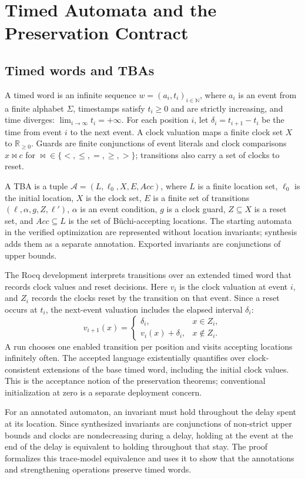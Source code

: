 \documentclass{ieeeaccess}
\providecommand{\Nat}{\mathbb{N}}
\providecommand{\Real}{\mathbb{R}}
\begin{document}
\section{Timed Automata and the Preservation Contract}
\label{sec:model}
\subsection{Timed words and TBAs}
A timed word is an infinite sequence $w=(a_i,t_i)_{i\in\Nat}$, where $a_i$ is an event from a finite alphabet $\Sigma$, timestamps satisfy $t_i\ge0$ and are strictly increasing, and time diverges: $\lim_{i\to\infty}t_i=+\infty$. For each position $i$, let $\delta_i=t_{i+1}-t_i$ be the time from event $i$ to the next event. A clock valuation maps a finite clock set $X$ to $\Real_{\ge0}$. Guards are finite conjunctions of event literals and clock comparisons $x\bowtie c$ for $\bowtie\in\{<,\le,=,\ge,>\}$; transitions also carry a set of clocks to reset.

A TBA is a tuple $\mathcal A=(L,\ell_0,X,E,\mathit{Acc})$, where $L$ is a finite location set, $\ell_0$ is the initial location, $X$ is the clock set, $E$ is a finite set of transitions $(\ell,\alpha,g,Z,\ell')$, $\alpha$ is an event condition, $g$ is a clock guard, $Z\subseteq X$ is a reset set, and $\mathit{Acc}\subseteq L$ is the set of B\"uchi-accepting locations. The starting automata in the verified optimization are represented without location invariants; synthesis adds them as a separate annotation. Exported invariants are conjunctions of upper bounds.

The Rocq development interprets transitions over an extended timed word that records clock values and reset decisions. Here $v_i$ is the clock valuation at event $i$, and $Z_i$ records the clocks reset by the transition on that event. Since a reset occurs at $t_i$, the next-event valuation includes the elapsed interval $\delta_i$:
\[
v_{i+1}(x)=
\begin{cases}
\delta_i,&x\in Z_i,\\
v_i(x)+\delta_i,&x\notin Z_i.
\end{cases}
\]
A run chooses one enabled transition per position and visits accepting locations infinitely often. The accepted language existentially quantifies over clock-consistent extensions of the base timed word, including the initial clock values. This is the acceptance notion of the preservation theorems; conventional initialization at zero is a separate deployment concern.

For an annotated automaton, an invariant must hold throughout the delay spent at its location. Since synthesized invariants are conjunctions of non-strict upper bounds and clocks are nondecreasing during a delay, holding at the event at the end of the delay is equivalent to holding throughout that stay. The proof formalizes this trace-model equivalence and uses it to show that the annotations and strengthening operations preserve timed words.
\end{document}
